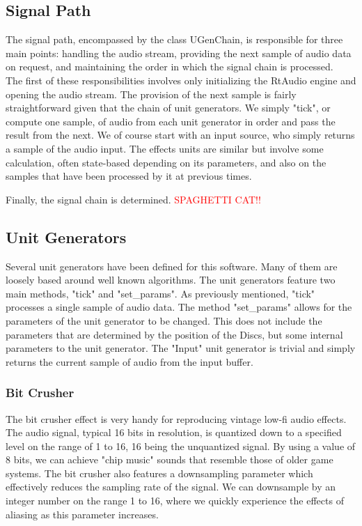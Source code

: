 \documentclass[pdftext,twoside,10pt]{article}
\newcommand{\spag}{\textcolor{red}{SPAGHETTI CAT!!}}
\begin{document}
\subsection{Signal Path}
The signal path, encompassed by the class UGenChain, is responsible for three main points: handling the audio stream, providing the next sample of audio data on request, and maintaining the order in which the signal chain is processed.\\
The first of these responsibilities involves only initializing the RtAudio engine and opening the audio stream. The provision of the next sample is fairly straightforward given that the chain of unit generators. We simply "tick", or compute one sample, of audio from each unit generator in order and pass the result from the next. We of course start with an input source, who simply returns a sample of the audio input. The effects units are similar but involve some calculation, often state-based depending on its parameters, and also on the samples that have been processed by it at previous times.

Finally, the signal chain is determined. \spag

\subsection{Unit Generators}
Several unit generators have been defined for this software. Many of them are loosely based around well known algorithms. The unit generators feature two main methods, "tick" and "set\_params". As previously mentioned, "tick" processes a single sample of audio data. The method "set\_params" allows for the parameters of the unit generator to be changed. This does not include the parameters that are determined by the position of the Discs, but some internal parameters to the unit generator. The "Input" unit generator is trivial and simply returns the current sample of audio from the input buffer.

\subsubsection{Bit Crusher}
The bit crusher effect is very handy for reproducing vintage low-fi audio effects. The audio signal, typical 16 bits in resolution, is quantized down to a specified level on the range of 1 to 16, 16 being the unquantized signal. By using a value of 8 bits, we can achieve "chip music" sounds that resemble those of older game systems. The bit crusher also features a downsampling parameter which effectively reduces the sampling rate of the signal. We can downsample by an integer number on the range 1 to 16, where we quickly experience the effects of aliasing as this parameter increases.
\end{document}
